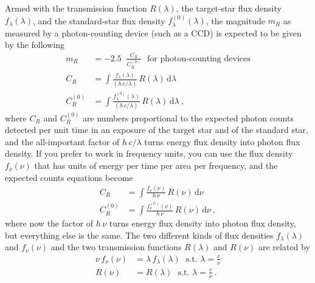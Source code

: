 \documentclass[10pt]{article}
\newcommand{\dd}{\mathrm{d}}
\DeclareMathOperator{\logten}{log_{10}}
\begin{document}
Armed with the transmission function $R(\lambda)$, the target-star flux density $f_\lambda(\lambda)$, and the standard-star flux density $f^{(0)}_\lambda(\lambda)$, the magnitude $m_R$ as measured by a photon-counting device (such as a CCD) is expected to be given by the following
\begin{align}
    m_R &= -2.5\logten\frac{C_R}{C^{(0)}_R} \mbox{~~for photon-counting devices}\label{eq:mag}\\
    C_R &= \int \frac{f_\lambda(\lambda)}{(h\,c/\lambda)}\,R(\lambda)\,\dd\lambda\label{eq:counts}\\
    C^{(0)}_R &= \int \frac{f^{(0)}_\lambda(\lambda)}{(h\,c/\lambda)}\,R(\lambda)\,\dd\lambda ~,
\end{align}
where $C_R$ and $C^{(0)}_R$ are numbers proportional to the expected photon counts detected per unit time in an exposure of the target star and of the standard star,
and the all-important factor of $h\,c/\lambda$ turns energy flux density into photon flux density.
If you prefer to work in frequency units, you can use the flux density $f_\nu(\nu)$ that has units of energy per time per area per frequency, and the expected counts equations become
\begin{align}
    C_R &= \int \frac{f_\nu(\nu)}{h\,\nu}\,R(\nu)\,\dd\nu\\
    C^{(0)}_R &= \int \frac{f^{(0)}_\nu(\nu)}{h\,\nu}\,R(\nu)\,\dd\nu ~,
\end{align}
where now the factor of $h\,\nu$ turns energy flux density into photon flux density, but everything else is the same.
The two different kinds of flux densities $f_\lambda(\lambda)$ and $f_\nu(\nu)$ and the two transmission functions $R(\lambda)$ and $R(\nu)$ are related by
\begin{align}
    \nu\,f_\nu(\nu) &= \lambda\,f_\lambda(\lambda) \mbox{~~s.t.~} \lambda = \frac{c}{\nu}\\
    R(\nu) &= R(\lambda) \mbox{~~s.t.~} \lambda = \frac{c}{\nu} ~.
\end{align}
\end{document}
